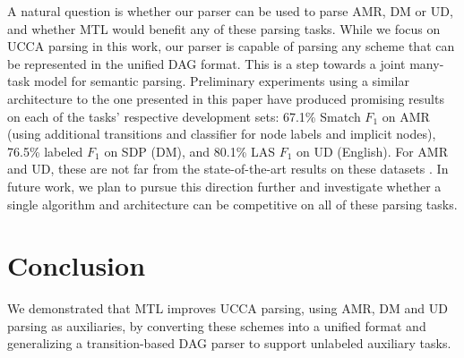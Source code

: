 \documentclass[11pt,a4paper]{article}
\begin{document}
A natural question is whether our parser can be used to parse AMR, DM or UD,
and whether MTL would benefit any of these parsing tasks.
While we focus on UCCA parsing in this work, our parser is capable of parsing any
scheme that can be represented in the unified DAG format.
This is a step towards a joint many-task model for semantic parsing.
Preliminary experiments using a similar architecture to the one presented in this paper have produced
promising results on each of the tasks' respective development sets:
67.1\% Smatch $F_1$ \cite{cai2013smatch} on AMR
(using additional transitions and classifier for node labels and implicit nodes),
76.5\% labeled $F_1$ on SDP (DM),
and 80.1\% LAS $F_1$ on UD (English).
For AMR and UD, these are not far from the state-of-the-art results on these datasets
\cite{foland2017abstract,dozat2016deep}.
In future work, we plan to pursue this direction further and investigate whether a single
algorithm and architecture can be competitive on all of these parsing tasks.

\section{Conclusion}\label{sec:conclusion}

We demonstrated that MTL improves UCCA parsing,
using AMR, DM and UD parsing as auxiliaries,
by converting these schemes into a unified format
and generalizing a transition-based DAG parser to support unlabeled auxiliary tasks.




\end{document}
